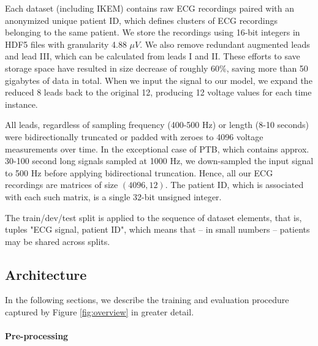\documentclass[preprint,12pt]{elsarticle}
\begin{document}
Each dataset (including IKEM) contains raw ECG recordings paired with an anonymized unique patient ID, which defines clusters of ECG recordings belonging to the same patient. We store the recordings using 16-bit integers in HDF5 files with granularity 4.88 $\mu V$. We also remove redundant augmented leads and lead III, which can be calculated from leads I and II. These efforts to save storage space have resulted in size decrease of roughly 60\%, saving more than 50 gigabytes of data in total. When we input the signal to our model, we expand the reduced 8 leads back to the original 12, producing 12 voltage values for each time instance.

All leads, regardless of sampling frequency (400-500 Hz) or length (8-10 seconds) were bidirectionally truncated or padded with zeroes to 4096 voltage measurements over time. In the exceptional case of PTB, which contains approx. 30-100 second long signals sampled at 1000 Hz, we down-sampled the input signal to 500 Hz before applying bidirectional truncation. Hence, all our ECG recordings are matrices of size $(4096, 12)$.  The patient ID, which is associated with each such matrix, is a single 32-bit unsigned integer.

The train/dev/test split is applied to the sequence of dataset elements, that is, tuples "ECG signal, patient ID", which means that -- in small numbers -- patients may be shared across splits. 



\subsection{Architecture}

\label{sec:architecture}

In the following sections, we describe the training and evaluation procedure captured by Figure \ref{fig:overview} in greater detail.

\paragraph{Pre-processing}
\end{document}
